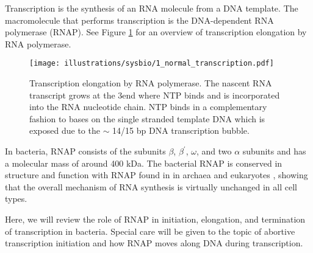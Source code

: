 %
Transcription is the synthesis of an RNA molecule from a DNA template. The
macromolecule that performs transcription is the DNA-dependent RNA polymerase
(RNAP). See Figure \ref{fig:transcription_elongation} for an overview of
transcription elongation by RNA polymerase.

\begin{figure}[htb]
	\begin{center}
		\texttt{[image: illustrations/sysbio/1\_normal\_transcription.pdf]}
	\end{center}
	\caption{Transcription elongation by RNA polymerase. The nascent RNA
	transcript grows at the 3\protect\ppp end where NTP binds and is
	incorporated into the RNA nucleotide chain. NTP binds in a complementary
	fashion to bases on the single stranded template DNA which is exposed due
	to the $\sim$ 14/15 bp DNA transcription bubble.}
	\label{fig:transcription_elongation}
\end{figure}

In bacteria, RNAP consists of the subunits $\beta$, $\beta^{\prime}$, $\omega$,
and two $\alpha$ subunits and has a molecular mass of around 400 kDa. The
bacterial RNAP is conserved in structure and function with RNAP found in in
archaea and eukaryotes \cite{borukhov_rna_2008}, showing that the overall
mechanism of RNA synthesis is virtually unchanged in all cell types.

Here, we will review the role of RNAP in initiation, elongation, and
termination of transcription in bacteria. Special care will be given to the
topic of abortive transcription initiation and how RNAP moves along DNA during
transcription.

